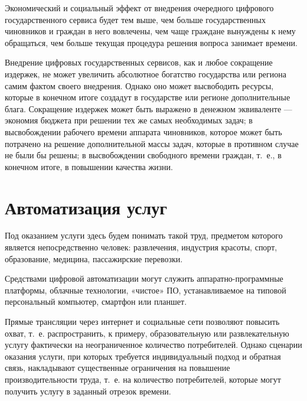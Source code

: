 \documentclass{article}
\begin{document}
Экономический и социальный эффект от внедрения очередного цифрового государственного сервиса будет тем выше, чем больше государственных чиновников и граждан в него вовлечены, чем чаще граждане вынуждены к нему обращаться, чем больше текущая процедура решения вопроса занимает времени.

Внедрение цифровых государственных сервисов, как и любое сокращение издержек, не может увеличить абсолютное богатство государства или региона самим фактом своего внедрения. Однако оно может высвободить ресурсы, которые в конечном итоге создадут в государстве или регионе дополнительные блага. Сокращение издержек может быть выражено в денежном эквиваленте — экономия бюджета при решении тех же самых необходимых задач; в высвобождении рабочего времени аппарата чиновников, которое может быть потрачено на решение дополнительной массы задач, которые в противном случае не были бы решены; в высвобождении свободного времени граждан, т.~е., в конечном итоге, в повышении качества жизни.

\section*{Автоматизация услуг}

Под оказанием услуги здесь будем понимать такой труд, предметом которого является непосредственно человек: развлечения, индустрия красоты, спорт, образование, медицина, пассажирские перевозки.

Средствами цифровой автоматизации могут служить аппаратно-программные платформы, облачные технологии, «чистое» ПО, устанавливаемое на типовой персональный компьютер, смартфон или планшет.

Прямые трансляции через интернет и социальные сети позволяют повысить охват, т.~е. распространить, к примеру, образовательную или развлекательную услугу фактически на неограниченное количество потребителей. Однако сценарии оказания услуги, при которых требуется индивидуальный подход и обратная связь, накладывают существенные ограничения на повышение производительности труда, т.~е. на количество потребителей, которые могут получить услугу в заданный отрезок времени.
\end{document}
